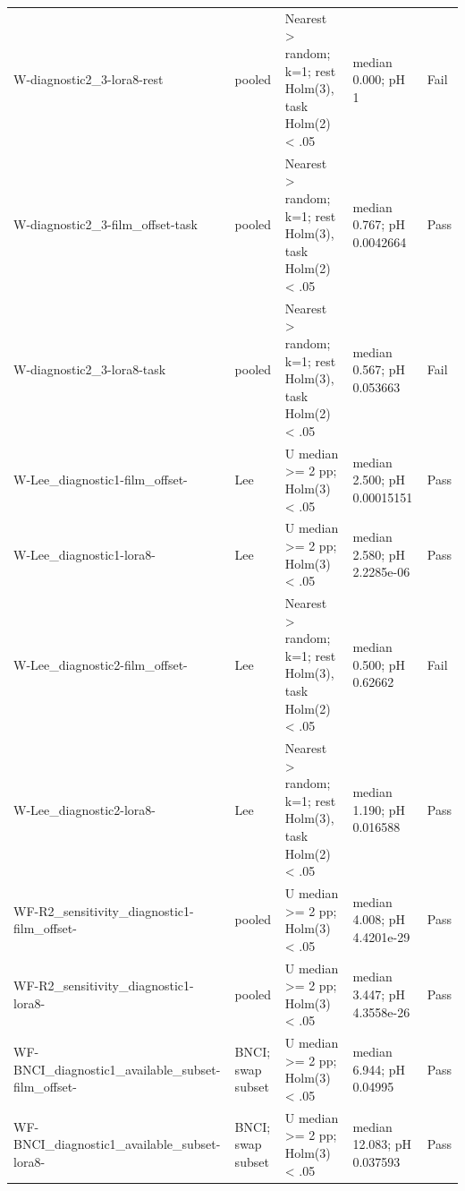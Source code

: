 \begin{longtable}{p{1.75in}p{.55in}p{2.15in}p{1.65in}p{.5in}}
W-diagnostic2\_\allowbreak{}3-lora8-rest & pooled & Nearest > random; k=1; rest Holm(3), task Holm(2) < .05 & median 0.000; pH 1 & Fail \\
W-diagnostic2\_\allowbreak{}3-film\_\allowbreak{}offset-task & pooled & Nearest > random; k=1; rest Holm(3), task Holm(2) < .05 & median 0.767; pH 0.0042664 & Pass \\
W-diagnostic2\_\allowbreak{}3-lora8-task & pooled & Nearest > random; k=1; rest Holm(3), task Holm(2) < .05 & median 0.567; pH 0.053663 & Fail \\
W-Lee\_\allowbreak{}diagnostic1-film\_\allowbreak{}offset- & Lee & U median >= 2 pp; Holm(3) < .05 & median 2.500; pH 0.00015151 & Pass \\
W-Lee\_\allowbreak{}diagnostic1-lora8- & Lee & U median >= 2 pp; Holm(3) < .05 & median 2.580; pH 2.2285e-06 & Pass \\
W-Lee\_\allowbreak{}diagnostic2-film\_\allowbreak{}offset- & Lee & Nearest > random; k=1; rest Holm(3), task Holm(2) < .05 & median 0.500; pH 0.62662 & Fail \\
W-Lee\_\allowbreak{}diagnostic2-lora8- & Lee & Nearest > random; k=1; rest Holm(3), task Holm(2) < .05 & median 1.190; pH 0.016588 & Pass \\
WF-R2\_\allowbreak{}sensitivity\_\allowbreak{}diagnostic1-film\_\allowbreak{}offset- & pooled & U median >= 2 pp; Holm(3) < .05 & median 4.008; pH 4.4201e-29 & Pass \\
WF-R2\_\allowbreak{}sensitivity\_\allowbreak{}diagnostic1-lora8- & pooled & U median >= 2 pp; Holm(3) < .05 & median 3.447; pH 4.3558e-26 & Pass \\
WF-BNCI\_\allowbreak{}diagnostic1\_\allowbreak{}available\_\allowbreak{}subset-film\_\allowbreak{}offset- & BNCI; swap subset & U median >= 2 pp; Holm(3) < .05 & median 6.944; pH 0.04995 & Pass \\
WF-BNCI\_\allowbreak{}diagnostic1\_\allowbreak{}available\_\allowbreak{}subset-lora8- & BNCI; swap subset & U median >= 2 pp; Holm(3) < .05 & median 12.083; pH 0.037593 & Pass \\
\bottomrule
\end{longtable}
